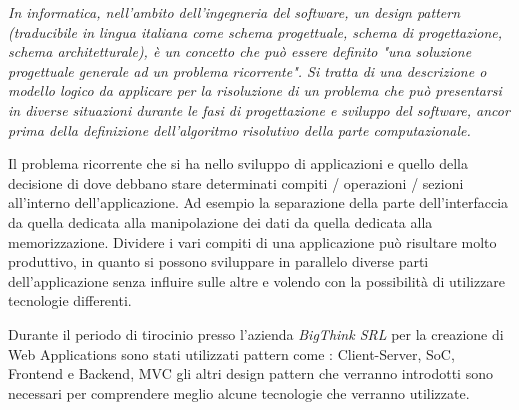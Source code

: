 \emph{In informatica, nell'ambito dell'ingegneria del software, un design pattern (traducibile in lingua italiana come schema progettuale, schema di progettazione, schema architetturale), è un concetto che può essere definito "una soluzione progettuale generale ad un problema ricorrente". Si tratta di una descrizione o modello logico da applicare per la risoluzione di un problema che può presentarsi in diverse situazioni durante le fasi di progettazione e sviluppo del software, ancor prima della definizione dell'algoritmo risolutivo della parte computazionale.}
\hspace*{\fill}\cite{wiki:design_pattern} 

Il problema ricorrente che si ha nello sviluppo di applicazioni e quello della decisione di dove debbano stare determinati compiti / operazioni / sezioni all'interno dell'applicazione. Ad esempio la separazione della parte dell'interfaccia da quella dedicata alla manipolazione dei dati da quella dedicata alla memorizzazione. Dividere i vari compiti di una applicazione può risultare molto produttivo, in quanto si possono sviluppare in parallelo diverse parti dell'applicazione senza influire sulle altre e volendo con la possibilità di utilizzare tecnologie differenti.

Durante il periodo di tirocinio presso l'azienda \emph{BigThink SRL} per la creazione di Web Applications sono stati utilizzati pattern come : Client-Server, SoC, Frontend e Backend, MVC gli altri design pattern che verranno introdotti sono necessari per comprendere meglio alcune tecnologie che verranno utilizzate.
 
